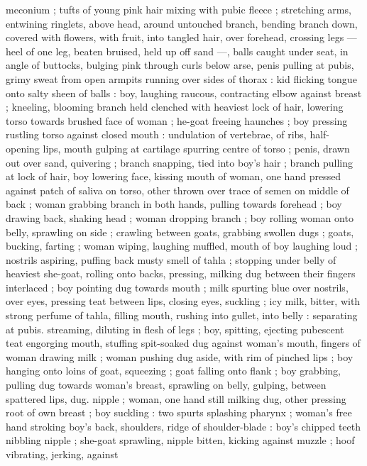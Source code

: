 meconium ; tufts of young pink hair mixing with pubic fleece ;
stretching arms, entwining ringlets, above head, around untouched
branch, bending branch down, covered with flowers, with fruit, into
tangled hair, over forehead, crossing legs --- heel of one leg, beaten
bruised, held up off sand ---, balls caught under seat, in angle of
buttocks, bulging pink through curls below arse, penis pulling at
pubis, grimy sweat from open armpits running over sides of thorax :
kid flicking tongue onto salty sheen of balls : boy, laughing raucous,
contracting elbow against breast ; kneeling, blooming branch held
clenched with heaviest lock of hair, lowering torso towards brushed
face of woman ; he-goat freeing haunches ; boy pressing rustling
torso against closed mouth : undulation of vertebrae, of ribs, half-
opening lips, mouth gulping at cartilage spurring centre of torso ;
penis, drawn out over sand, quivering ; branch snapping, tied into
boy’s hair ; branch pulling at lock of hair, boy lowering face, kissing
mouth of woman, one hand pressed against patch of saliva on torso,
other thrown over trace of semen on middle of back ; woman
grabbing branch in both hands, pulling towards forehead ; boy
drawing back, shaking head ; woman dropping branch ; boy rolling
woman onto belly, sprawling on side ; crawling between goats,
grabbing swollen dugs ; goats, bucking, farting ; woman wiping,
laughing muffled, mouth of boy laughing loud ; nostrils aspiring,
puffing back musty smell of tahla ; stopping under belly of heaviest
she-goat, rolling onto backs, pressing, milking dug between their
fingers interlaced ; boy pointing dug towards mouth ; milk spurting
blue over nostrils, over eyes, pressing teat between lips, closing
eyes, suckling ; icy milk, bitter, with strong perfume of tahla, filling
mouth, rushing into gullet, into belly : separating at pubis.
streaming, diluting in flesh of legs ; boy, spitting, ejecting pubescent
teat engorging mouth, stuffing spit-soaked dug against woman's
mouth, fingers of woman drawing milk ; woman pushing dug aside,
with rim of pinched lips ; boy hanging onto loins of goat, squeezing
; goat falling onto flank ; boy grabbing, pulling dug towards woman's
breast, sprawling on belly, gulping, between spattered lips, dug.
nipple ; woman, one hand still milking dug, other pressing root of
own breast ; boy suckling : two spurts splashing pharynx ; woman's
free hand stroking boy's back, shoulders, ridge of shoulder-blade :
boy's chipped teeth nibbling nipple ; she-goat sprawling, nipple
bitten, kicking against muzzle ; hoof vibrating, jerking, against

